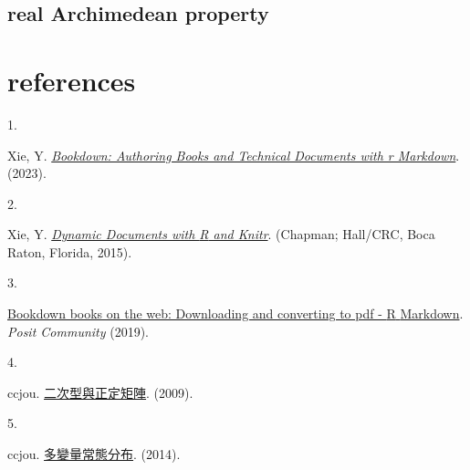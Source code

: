 \documentclass[
]{book}
\newlength{\cslhangindent}
\newlength{\csllabelwidth}
\newlength{\cslentryspacingunit} %
\newenvironment{CSLReferences}[2] %
 {%
  \setlength{\parindent}{0pt}
  \ifodd #1
  \let\oldpar\par
  \def\par{\hangindent=\cslhangindent\oldpar}
  \fi
  \setlength{\parskip}{#2\cslentryspacingunit}
 }%
 {}
\newcommand{\CSLLeftMargin}[1]{\parbox[t]{\csllabelwidth}{#1}}
\newcommand{\CSLRightInline}[1]{\parbox[t]{\linewidth - \csllabelwidth}{#1}\break}
\theoremstyle{definition}
\theoremstyle{definition}
\theoremstyle{definition}
\theoremstyle{definition}
\theoremstyle{remark}
\begin{document}
\hypertarget{real-archimedean-property}{%
\section{real Archimedean property}\label{real-archimedean-property}}

\hypertarget{references}{%
\chapter*{references}\label{references}}

\hypertarget{refs}{}
\begin{CSLReferences}{0}{0}
\leavevmode{}%
\CSLLeftMargin{1. }%
\CSLRightInline{Xie, Y. \emph{\href{https://github.com/rstudio/bookdown}{Bookdown: Authoring Books and Technical Documents with r Markdown}}. (2023).}

\leavevmode{}%
\CSLLeftMargin{2. }%
\CSLRightInline{Xie, Y. \emph{\href{http://yihui.org/knitr/}{Dynamic Documents with {R} and Knitr}}. (Chapman; Hall/CRC, Boca Raton, Florida, 2015).}

\leavevmode{}%
\CSLLeftMargin{3. }%
\CSLRightInline{\href{https://community.rstudio.com/t/bookdown-books-on-the-web-downloading-and-converting-to-pdf/30268}{Bookdown books on the web: Downloading and converting to pdf - {R} {Markdown}}. \emph{Posit Community} (2019).}

\leavevmode{}%
\CSLLeftMargin{4. }%
\CSLRightInline{ccjou. \href{https://ccjou.wordpress.com/2009/10/21/\%e4\%ba\%8c\%e6\%ac\%a1\%e5\%9e\%8b\%e8\%88\%87\%e6\%ad\%a3\%e5\%ae\%9a\%e7\%9f\%a9\%e9\%99\%a3/}{二次型與正定矩陣}. (2009).}

\leavevmode{}%
\CSLLeftMargin{5. }%
\CSLRightInline{ccjou. \href{https://ccjou.wordpress.com/2014/06/05/\%e5\%a4\%9a\%e8\%ae\%8a\%e9\%87\%8f\%e5\%b8\%b8\%e6\%85\%8b\%e5\%88\%86\%e5\%b8\%83/}{多變量常態分布}. (2014).}

\end{CSLReferences}
\end{document}
